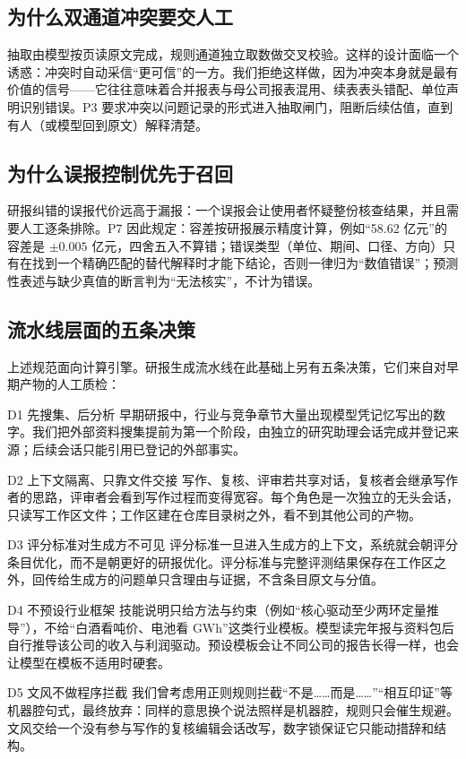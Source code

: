 \subsection{为什么双通道冲突要交人工}
抽取由模型按页读原文完成，规则通道独立取数做交叉校验。这样的设计面临一个诱惑：冲突时自动采信“更可信”的一方。我们拒绝这样做，因为冲突本身就是最有价值的信号——它往往意味着合并报表与母公司报表混用、续表表头错配、单位声明识别错误。P3 要求冲突以问题记录的形式进入抽取闸门，阻断后续估值，直到有人（或模型回到原文）解释清楚。

\subsection{为什么误报控制优先于召回}
研报纠错的误报代价远高于漏报：一个误报会让使用者怀疑整份核查结果，并且需要人工逐条排除。P7 因此规定：容差按研报展示精度计算，例如“58.62 亿元”的容差是 $\pm 0.005$ 亿元，四舍五入不算错；错误类型（单位、期间、口径、方向）只有在找到一个精确匹配的替代解释时才能下结论，否则一律归为“数值错误”；预测性表述与缺少真值的断言判为“无法核实”，不计为错误。

\subsection{流水线层面的五条决策}
\label{sec:pipeline-decisions}
上述规范面向计算引擎。研报生成流水线在此基础上另有五条决策，它们来自对早期产物的人工质检：

\begin{designbox}{D1 先搜集、后分析}
早期研报中，行业与竞争章节大量出现模型凭记忆写出的数字。我们把外部资料搜集提前为第一个阶段，由独立的研究助理会话完成并登记来源；后续会话只能引用已登记的外部事实。
\end{designbox}
\vspace{0.4ex}
\begin{designbox}{D2 上下文隔离、只靠文件交接}
写作、复核、评审若共享对话，复核者会继承写作者的思路，评审者会看到写作过程而变得宽容。每个角色是一次独立的无头会话，只读写工作区文件；工作区建在仓库目录树之外，看不到其他公司的产物。
\end{designbox}
\vspace{0.4ex}
\begin{designbox}{D3 评分标准对生成方不可见}
评分标准一旦进入生成方的上下文，系统就会朝评分条目优化，而不是朝更好的研报优化。评分标准与完整评测结果保存在工作区之外，回传给生成方的问题单只含理由与证据，不含条目原文与分值。
\end{designbox}
\vspace{0.4ex}
\begin{designbox}{D4 不预设行业框架}
技能说明只给方法与约束（例如“核心驱动至少两环定量推导”），不给“白酒看吨价、电池看 GWh”这类行业模板。模型读完年报与资料包后自行推导该公司的收入与利润驱动。预设模板会让不同公司的报告长得一样，也会让模型在模板不适用时硬套。
\end{designbox}
\vspace{0.4ex}
\begin{designbox}{D5 文风不做程序拦截}
我们曾考虑用正则规则拦截“不是……而是……”“相互印证”等机器腔句式，最终放弃：同样的意思换个说法照样是机器腔，规则只会催生规避。文风交给一个没有参与写作的复核编辑会话改写，数字锁保证它只能动措辞和结构。
\end{designbox}
